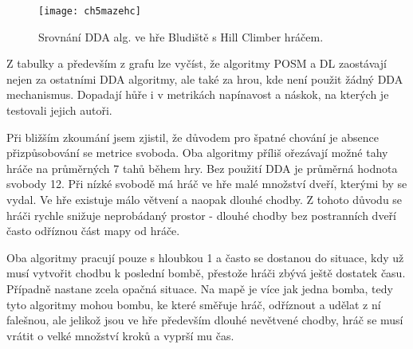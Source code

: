 \begin{figure}
  \centering
  \texttt{[image: ch5mazehc]}
	\caption{Srovnání DDA alg. ve hře Bludiště s Hill Climber hráčem.}
	\label{fig-ch5mazehc}
\end{figure}

Z tabulky a především z grafu lze vyčíst, že algoritmy POSM a DL zaostávají nejen za ostatními DDA algoritmy, ale také za hrou, kde není použit žádný DDA mechanismus. Dopadají hůře i v metrikách napínavost a náskok, na kterých je testovali jejich autoři.

Při bližším zkoumání jsem zjistil, že důvodem pro špatné chování je absence přizpůsobování se metrice svoboda. Oba algoritmy příliš ořezávají možné tahy hráče na průměrných 7 tahů během hry. Bez použití DDA je průměrná hodnota svobody 12. Při nízké svobodě má hráč ve hře malé množství dveří, kterými by se vydal. Ve hře existuje málo větvení a naopak dlouhé chodby. Z tohoto důvodu se hráči rychle snižuje neprobádaný prostor - dlouhé chodby bez postranních dveří často odříznou část mapy od hráče. 

Oba algoritmy pracují pouze s hloubkou 1 a často se dostanou do situace, kdy už musí vytvořit chodbu k poslední bombě, přestože hráči zbývá ještě dostatek času. Případně nastane zcela opačná situace. Na mapě je více jak jedna bomba, tedy tyto algoritmy mohou bombu, ke které směřuje hráč, odříznout a udělat z ní falešnou, ale jelikož jsou ve hře především dlouhé nevětvené chodby, hráč se musí vrátit o velké množství kroků a vyprší mu čas.

